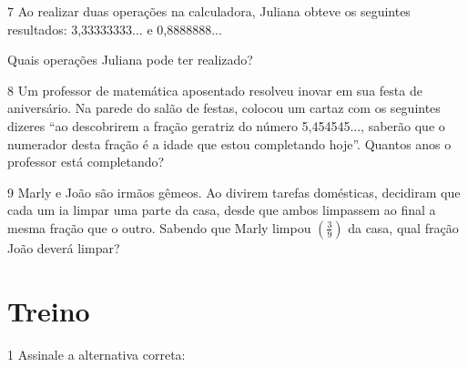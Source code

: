 \num{7} Ao realizar duas operações na calculadora, Juliana obteve os
seguintes resultados: 3,33333333... e 0,8888888...

Quais operações Juliana pode ter realizado?









\num{8} Um professor de matemática aposentado resolveu inovar em sua festa de
aniversário. Na parede do salão de festas, colocou um cartaz com os
seguintes dizeres ``ao descobrirem a fração geratriz do número
5,454545..., saberão que o numerador desta fração é a idade que estou
completando hoje''. Quantos anos o professor está completando?









\num{9} Marly e João são irmãos gêmeos. Ao divirem tarefas domésticas,
decidiram que cada um ia limpar uma parte da casa, desde que ambos
limpassem ao final a mesma fração que o outro. Sabendo que Marly limpou
$(\frac{3}{9})$ da casa, qual fração João deverá limpar?


\section{Treino}

\num{1} Assinale a alternativa correta:

